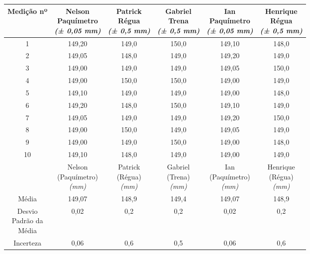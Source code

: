 \documentclass{article}
\begin{document}
\begin{table}[h!]
\centering
\begin{tabular}{c c c c c c }
\toprule
Medição nº & \shortstack{Nelson\\Paquímetro\\\textit{(± 0,05 mm)}} & \shortstack{Patrick\\Régua\\\textit{(± 0,5 mm)}} & \shortstack{Gabriel\\Trena\\\textit{(± 0,5 mm)}} & \shortstack{Ian\\Paquímetro\\\textit{(± 0,05 mm)}} & \shortstack{Henrique\\Régua\\\textit{(± 0,5 mm)}}\\
\midrule
1 & 149,20 & 149,0 & 150,0 & 149,10 & 148,0\\
2 & 149,05 & 148,0 & 149,0 & 149,20 & 149,0\\
3 & 149,00 & 149,0 & 149,0 & 149,05 & 150,0\\
4 & 149,00 & 150,0 & 150,0 & 149,00 & 149,0\\
5 & 149,10 & 149,0 & 149,0 & 149,00 & 148,0\\
6 & 149,20 & 148,0 & 150,0 & 149,10 & 149,0\\
7 & 149,05 & 149,0 & 149,0 & 149,20 & 150,0\\
8 & 149,00 & 150,0 & 149,0 & 149,05 & 149,0\\
9 & 149,00 & 149,0 & 150,0 & 149,00 & 148,0\\
10 & 149,10 & 148,0 & 149,0 & 149,00 & 149,0\\
\midrule
&\shortstack{Nelson\\(Paquímetro)\\\textit{(mm)}} & \shortstack{Patrick\\(Régua)\\\textit{(mm)}} & \shortstack{Gabriel\\(Trena)\\\textit{(mm)}} & \shortstack{Ian\\(Paquímetro)\\\textit{(mm)}} & \shortstack{Henrique\\(Régua)\\\textit{(mm)}}\\
\midrule
Média & 149,07 & 148,9 & 149,4 & 149,07 & 148,9\\[3pt]
\shortstack{Desvio\\Padrão da\\Média} & 0,02 & 0,2 & 0,2 & 0,02 & 0,2\\[3pt]
Incerteza & 0,06 & 0,6 & 0,5 & 0,06 & 0,6\\
\bottomrule
\end{tabular}
\end{table}
\end{document}
